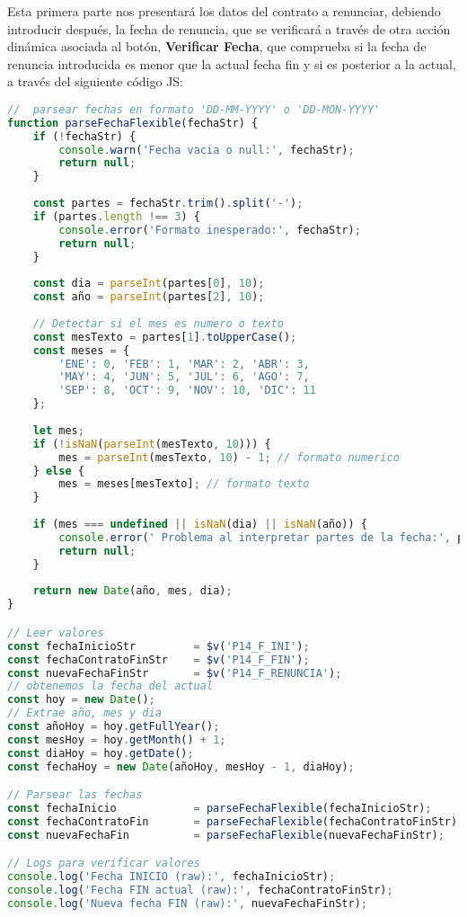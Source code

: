 Esta primera parte nos presentará los datos del contrato a renunciar, debiendo introducir después, la fecha de renuncia, que se verificará a través de otra acción dinámica asociada al botón, \textbf{Verificar Fecha}, que comprueba si la fecha de renuncia introducida es menor que la actual fecha fin y si es posterior a la actual, a través del siguiente código \acrshort{JS}:
\begin{lstlisting}[language=JavaScript, caption={Verifica las fecha de renuncia del contrato}]
//  parsear fechas en formato 'DD-MM-YYYY' o 'DD-MON-YYYY'
function parseFechaFlexible(fechaStr) {
	if (!fechaStr) {
		console.warn('Fecha vacia o null:', fechaStr);
		return null;
	}
	
	const partes = fechaStr.trim().split('-');
	if (partes.length !== 3) {
		console.error('Formato inesperado:', fechaStr);
		return null;
	}
	
	const dia = parseInt(partes[0], 10);
	const año = parseInt(partes[2], 10);
	
	// Detectar si el mes es numero o texto
	const mesTexto = partes[1].toUpperCase();
	const meses = {
		'ENE': 0, 'FEB': 1, 'MAR': 2, 'ABR': 3,
		'MAY': 4, 'JUN': 5, 'JUL': 6, 'AGO': 7,
		'SEP': 8, 'OCT': 9, 'NOV': 10, 'DIC': 11
	};
	
	let mes;
	if (!isNaN(parseInt(mesTexto, 10))) {
		mes = parseInt(mesTexto, 10) - 1; // formato numerico
	} else {
		mes = meses[mesTexto]; // formato texto
	}
	
	if (mes === undefined || isNaN(dia) || isNaN(año)) {
		console.error(' Problema al interpretar partes de la fecha:', partes);
		return null;
	}
	
	return new Date(año, mes, dia);
}

// Leer valores 
const fechaInicioStr         = $v('P14_F_INI');
const fechaContratoFinStr    = $v('P14_F_FIN');
const nuevaFechaFinStr       = $v('P14_F_RENUNCIA');
// obtenemos la fecha del actual
const hoy = new Date();
// Extrae año, mes y dia
const añoHoy = hoy.getFullYear();
const mesHoy = hoy.getMonth() + 1; 
const diaHoy = hoy.getDate();
const fechaHoy = new Date(añoHoy, mesHoy - 1, diaHoy); 

// Parsear las fechas
const fechaInicio            = parseFechaFlexible(fechaInicioStr);
const fechaContratoFin       = parseFechaFlexible(fechaContratoFinStr);
const nuevaFechaFin          = parseFechaFlexible(nuevaFechaFinStr);

// Logs para verificar valores
console.log('Fecha INICIO (raw):', fechaInicioStr);
console.log('Fecha FIN actual (raw):', fechaContratoFinStr);
console.log('Nueva fecha FIN (raw):', nuevaFechaFinStr);



\end{lstlisting}
